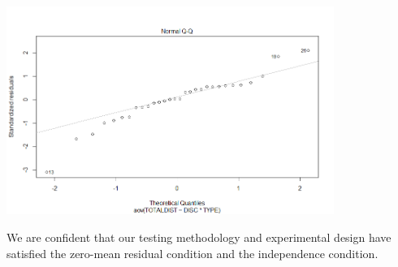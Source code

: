 \documentclass[letter,12pt]{article}
\begin{document}
  \begin{center}
    \includegraphics[width=0.8\textwidth]{normalthrow.png}
  \end{center}
  We are confident that our testing methodology and experimental design have satisfied the zero-mean residual condition and the independence condition.\par
	
\end{document}
